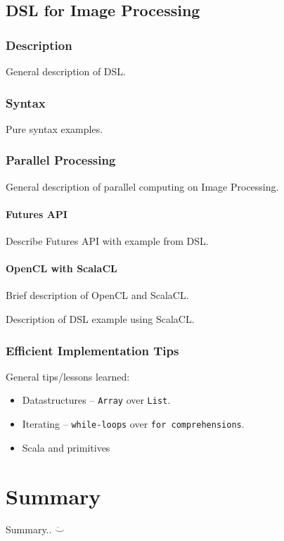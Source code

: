 \documentclass[a4paper,english]{report}
\begin{document}
\section{DSL for Image Processing}

\subsection{Description}

General description of DSL.

\subsection{Syntax}

Pure syntax examples.

\subsection{Parallel Processing}

General description of parallel computing on Image Processing.

\subsubsection{Futures API}

Describe Futures API with example from DSL.

\subsubsection{OpenCL with ScalaCL}

Brief description of OpenCL and ScalaCL.

Description of DSL example using ScalaCL.

\subsection{Efficient Implementation Tips}

General tips/lessons learned:

\begin{itemize}
  \item Datastructures -- \texttt{Array} over \texttt{List}.
  \item Iterating -- \texttt{while-loops} over \texttt{for comprehensions}.
  \item Scala and primitives
\end{itemize}

\chapter{Summary}

Summary.. $\ddot\smile$



\end{document}
